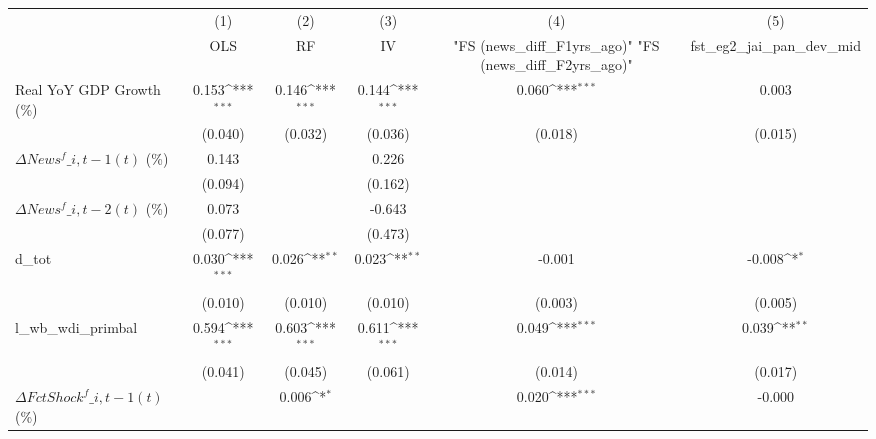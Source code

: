 {
\def\sym#1{\ifmmode^{#1}\else\(^{#1}\)\fi}
\begin{tabular}{l*{5}{c}}
\toprule
                    &\multicolumn{1}{c}{(1)}&\multicolumn{1}{c}{(2)}&\multicolumn{1}{c}{(3)}&\multicolumn{1}{c}{(4)}&\multicolumn{1}{c}{(5)}\\
                    &\multicolumn{1}{c}{OLS}&\multicolumn{1}{c}{RF}&\multicolumn{1}{c}{IV}&\multicolumn{1}{c}{ "FS (news\_diff\_F1yrs\_ago)"  "FS (news\_diff\_F2yrs\_ago)" }&\multicolumn{1}{c}{fst\_eg2\_jai\_pan\_dev\_mid}\\
\midrule
Real YoY GDP Growth (\%)&       0.153\sym{***}&       0.146\sym{***}&       0.144\sym{***}&       0.060\sym{***}&       0.003         \\
                    &     (0.040)         &     (0.032)         &     (0.036)         &     (0.018)         &     (0.015)         \\
\addlinespace
$ \Delta News^f\_{i,t-1}(t)$ (\%)&       0.143         &                     &       0.226         &                     &                     \\
                    &     (0.094)         &                     &     (0.162)         &                     &                     \\
\addlinespace
$ \Delta News^f\_{i,t-2}(t)$ (\%)&       0.073         &                     &      -0.643         &                     &                     \\
                    &     (0.077)         &                     &     (0.473)         &                     &                     \\
\addlinespace
d\_tot               &       0.030\sym{***}&       0.026\sym{**} &       0.023\sym{**} &      -0.001         &      -0.008\sym{*}  \\
                    &     (0.010)         &     (0.010)         &     (0.010)         &     (0.003)         &     (0.005)         \\
\addlinespace
l\_wb\_wdi\_primbal    &       0.594\sym{***}&       0.603\sym{***}&       0.611\sym{***}&       0.049\sym{***}&       0.039\sym{**} \\
                    &     (0.041)         &     (0.045)         &     (0.061)         &     (0.014)         &     (0.017)         \\
\addlinespace
$ \Delta FctShock^f\_{i,t-1}(t)$ (\%)&                     &       0.006\sym{*}  &                     &       0.020\sym{***}&      -0.000         \\

\end{tabular}}
